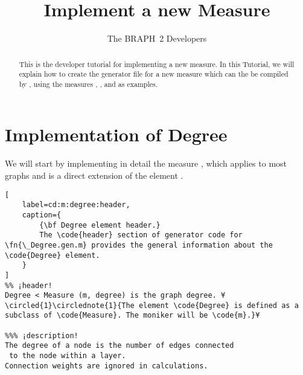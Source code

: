 \documentclass{tufte-handout}
\title{Implement a new Measure}
\author[The BRAPH~2 Developers]{The BRAPH~2 Developers}
\begin{document}
\maketitle

\begin{abstract}
\noindent
This is the developer tutorial for implementing a new measure. 
In this Tutorial, we will explain how to create the generator file  for a new measure which can the be compiled by , using the measures , , and  as examples.
\end{abstract}

\section{Implementation of Degree}

We will start by implementing in detail the measure , which applies to most graphs and is a direct extension of the element .

\begin{lstlisting}[
	label=cd:m:degree:header,
	caption={
		{\bf Degree element header.}
		The \code{header} section of generator code for \fn{\_Degree.gen.m} provides the general information about the \code{Degree} element.
	}
]
%% ¡header!
Degree < Measure (m, degree) is the graph degree. ¥\circled{1}\circlednote{1}{The element \code{Degree} is defined as a subclass of \code{Measure}. The moniker will be \code{m}.}¥

%%% ¡description!
The degree of a node is the number of edges connected 
 to the node within a layer. 
Connection weights are ignored in calculations.
\end{lstlisting}
\end{document}

